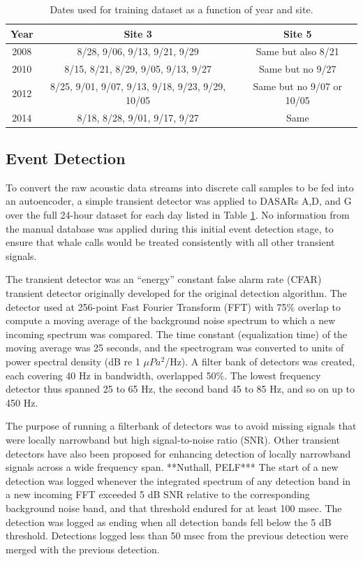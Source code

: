 \documentclass[preprint,NumberedRefs]{JASAnew}
\begin{document}
\begin{table}[ht]
    \centering
    \caption{Dates used for training dataset as a function of year and site.}
    \label{tab:training_dates}
    \begin{tabular}{|c | c | c|}
        \hline
        Year & Site 3 & Site 5 \\
        \hline
        2008 & 8/28, 9/06, 9/13, 9/21, 9/29 & Same but also 8/21 \\
        2010 & 8/15, 8/21, 8/29, 9/05, 9/13, 9/27 & Same but no 9/27 \\
        2012 & 8/25, 9/01, 9/07, 9/13, 9/18, 9/23, 9/29, 10/05 & Same but no 9/07 or 10/05 \\
        2014 & 8/18, 8/28, 9/01, 9/17, 9/27 & Same \\
        \hline
    \end{tabular}
\end{table}

\subsection{\label{sec:EventDetection}Event Detection}

To convert the raw acoustic data streams into discrete call samples to be fed into an autoencoder, a simple transient detector was applied to DASARs A,D, and G over the full 24-hour dataset for each day listed in Table \ref{tab:training_dates}.  No information from the manual database was applied during this initial event detection stage, to ensure that whale calls would be treated consistently with all other transient signals.

The transient detector was an “energy” constant false alarm rate (CFAR) transient detector originally developed for the original detection algorithm\cite{thode2012automated}.  The detector used at 256-point Fast Fourier Transform (FFT) with 75\% overlap to compute a moving average of the background noise spectrum to which a new incoming spectrum was compared.  The time constant (equalization time) of the moving average was 25 seconds, and the spectrogram was converted to units of power spectral density (dB re 1 $\mu Pa^2$/Hz).   A filter bank of detectors was created, each covering 40 Hz in bandwidth, overlapped 50\%.  The lowest frequency detector thus spanned 25 to 65 Hz, the second band 45 to 85 Hz, and so on up to 450 Hz.  

The purpose of running a filterbank of detectors was to avoid missing signals that were locally narrowband but high signal-to-noise ratio (SNR).  Other transient detectors have also been proposed for enhancing detection of locally narrowband signals across a wide frequency span. **Nuthall, PELF*** 
The start of a new detection was logged whenever the integrated spectrum of any detection band in a new incoming FFT exceeded 5 dB SNR relative to the corresponding background noise band, and that threshold endured for at least 100 msec.  The detection was logged as ending when all detection bands fell below the 5 dB threshold.  Detections logged less than 50 msec from the previous detection were merged with the previous detection.
\end{document}
